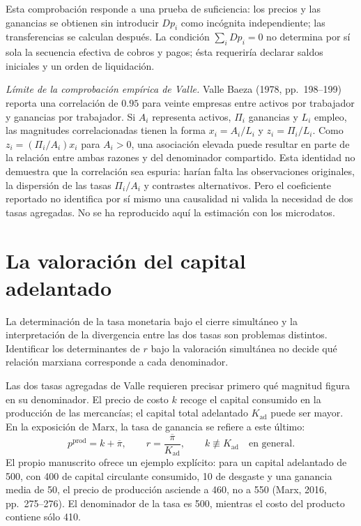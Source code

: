 \documentclass[10pt,twoside]{article}
\begin{document}
Esta comprobación responde a una prueba de suficiencia: los precios y las ganancias se obtienen sin introducir $Dp_i$ como incógnita independiente; las transferencias se calculan después. La condición $\sum_i Dp_i=0$ no determina por sí sola la secuencia efectiva de cobros y pagos; ésta requeriría declarar saldos iniciales y un orden de liquidación. 

\noindent\textit{Límite de la comprobación empírica de Valle.} Valle Baeza (1978, pp.~198--199) reporta una correlación de $0.95$ para veinte empresas entre activos por trabajador y ganancias por trabajador. Si $A_i$ representa activos, $\Pi_i$ ganancias y $L_i$ empleo, las magnitudes correlacionadas tienen la forma $x_i=A_i/L_i$ y $z_i=\Pi_i/L_i$. Como $z_i=(\Pi_i/A_i)x_i$ para $A_i>0$, una asociación elevada puede resultar en parte de la relación entre ambas razones y del denominador compartido. Esta identidad no demuestra que la correlación sea espuria: harían falta las observaciones originales, la dispersión de las tasas $\Pi_i/A_i$ y contrastes alternativos. Pero el coeficiente reportado no identifica por sí mismo una causalidad ni valida la necesidad de dos tasas agregadas. No se ha reproducido aquí la estimación con los microdatos. 



\section{La valoración del capital adelantado}
La determinación de la tasa monetaria bajo el cierre simultáneo y la interpretación de la divergencia entre las dos tasas son problemas distintos. Identificar los determinantes de $r$ bajo la valoración simultánea no decide qué relación marxiana corresponde a cada denominador.

Las dos tasas agregadas de Valle requieren precisar primero qué magnitud figura en su denominador. El precio de costo $k$ recoge el capital consumido en la producción de las mercancías; el capital total adelantado $K_{\mathrm{ad}}$ puede ser mayor. En la exposición de Marx, la tasa de ganancia se refiere a este último:
\begin{equation}
p^{\mathrm{prod}}=k+\overline\pi,\qquad
r=\frac{\overline\pi}{K_{\mathrm{ad}}},\qquad
k\not\equiv K_{\mathrm{ad}}\quad\text{en general}.\label{eq:costK}
\end{equation}
El propio manuscrito ofrece un ejemplo explícito: para un capital adelantado de 500, con 400 de capital circulante consumido, 10 de desgaste y una ganancia media de 50, el precio de producción asciende a 460, no a 550 (Marx, 2016, pp.~275--276). El denominador de la tasa es 500, mientras el costo del producto contiene sólo 410.
\end{document}
